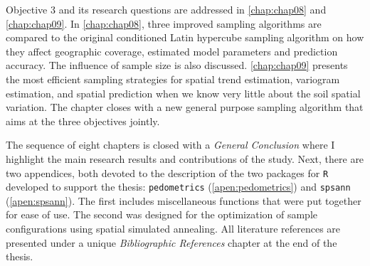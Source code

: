 Objective 3 and its research questions are addressed in \autoref{chap:chap08} and \autoref{chap:chap09}. In 
\autoref{chap:chap08}, three improved sampling algorithms are compared to the original conditioned Latin 
hypercube sampling algorithm on how they affect geographic coverage, estimated model parameters and prediction 
accuracy. The influence of sample size is also discussed. \autoref{chap:chap09} presents the most efficient 
sampling strategies for spatial trend estimation, variogram estimation, and spatial prediction when we know 
very little about the soil spatial variation. The chapter closes with a new general purpose sampling algorithm 
that aims at the three objectives jointly.

The sequence of eight chapters is closed with a \emph{General Conclusion} where I highlight the main research 
results and contributions of the study. Next, there are two appendices, both devoted to the description of the 
two packages for \texttt{R} developed to support the thesis: \texttt{pedometrics} (\autoref{apen:pedometrics}) 
and \texttt{spsann} (\autoref{apen:spsann}). The first includes miscellaneous functions that were put together 
for ease of use. The second was designed for the optimization of sample configurations using spatial simulated 
annealing. All literature references are presented under a unique \emph{Bibliographic References} chapter at 
the end of the thesis.

